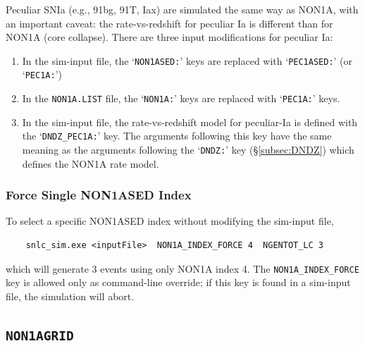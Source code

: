 \documentclass[12pt]{article}
\begin{document}
Peculiar SNIa (e.g., 91bg, 91T, Iax) are simulated the
same way as NON1A, with an important caveat:
the rate-vs-redshift for peculiar Ia is different than
for NON1A (core collapse).
There are three input modifications for peculiar Ia:
%
\begin{enumerate}[noitemsep]
   \item In the sim-input file, the `{\tt NON1ASED:}' keys are replaced
         with `{\tt PEC1ASED:}' (or `{\tt PEC1A:}') 
   \item In the {\tt NON1A.LIST} file, the `{\tt NON1A:}' keys are 
          replaced with `{\tt PEC1A:}'  keys.
   \item In the sim-input file, the rate-vs-redshift model 
         for peculiar-Ia is defined with the `{\tt DNDZ\_PEC1A:}' key. 
         The arguments
         following this key have the same meaning as the
         arguments following the `{\tt DNDZ:}' key 
         (\S\ref{subsec:DNDZ}) which defines the NON1A rate model.
\end{enumerate}


\subsubsection{Force Single NON1ASED Index}
\label{sss:NON1A_INDEX_FORCE}

To select a specific NON1ASED index without modifying the sim-input file,
\begin{verbatim}
    snlc_sim.exe <inputFile>  NON1A_INDEX_FORCE 4  NGENTOT_LC 3
\end{verbatim}
%
which will generate 3 events using only NON1A index 4.
The {\tt NON1A\_INDEX\_FORCE} key is allowed only as command-line override;
if this key is found in a sim-input file, the simulation will abort.


\clearpage
\subsection{\tt NON1AGRID}
\label{subsec:NON1AGRID}
\end{document}
